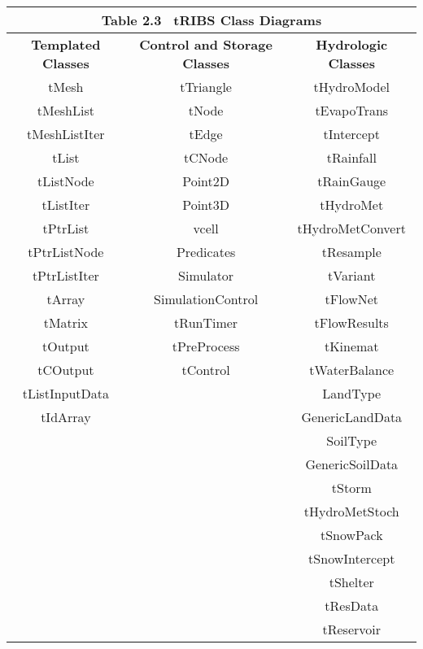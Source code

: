 \documentclass[12pt]{article}
\begin{document}
\begin{tabular}{ccc}
\multicolumn{3}{c}{\textbf{ Table 2.3} \, tRIBS Class Diagrams} \\ \hline
\textbf{Templated Classes} & \textbf{Control and Storage Classes} & \textbf{Hydrologic Classes} \\ \hline
tMesh & tTriangle & tHydroModel \\
tMeshList & tNode & tEvapoTrans \\
tMeshListIter & tEdge & tIntercept \\
tList & tCNode & tRainfall \\
tListNode & Point2D & tRainGauge \\
tListIter & Point3D & tHydroMet \\
tPtrList & vcell & tHydroMetConvert \\
tPtrListNode & Predicates & tResample \\
tPtrListIter & Simulator& tVariant \\
tArray & SimulationControl & tFlowNet \\
tMatrix & tRunTimer & tFlowResults \\
tOutput & tPreProcess & tKinemat \\
tCOutput & tControl & tWaterBalance \\
tListInputData & & LandType \\
tIdArray &  & GenericLandData \\
         &  & SoilType \\
 &  & GenericSoilData \\
 &  & tStorm \\
 &  & tHydroMetStoch \\
 &  & tSnowPack \\
 &  & tSnowIntercept \\
 &  & tShelter \\
 &  & tResData \\
 &  & tReservoir \\
\end{tabular}
\end{document}
